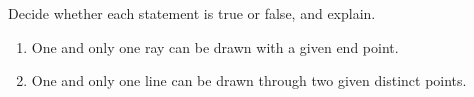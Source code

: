 Decide whether each statement is true or false, and explain.
\begin{enumerate}
\item[(i)] One and only one ray can be drawn with a given end point.
\item[(ii)] One and only one line can be drawn through two given distinct points.
\end{enumerate}
